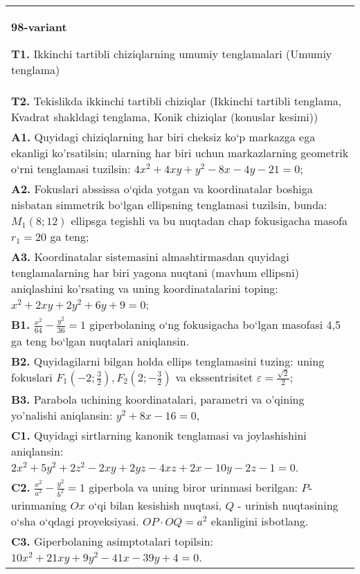 \documentclass{article}
\begin{document}
\begin{tabular}{m{17cm}}
\textbf{98-variant}
\newline

\textbf{T1.} Ikkinchi tartibli chiziqlarning umumiy tenglamalari (Umumiy tenglama) \\
\textbf{T2.} Tekislikda ikkinchi tartibli chiziqlar (Ikkinchi tartibli tenglama, Kvadrat shakldagi tenglama, Konik chiziqlar (konuslar kesimi)) \\
\textbf{A1.} Quyidagi chiziqlarning har biri cheksiz ko‘p markazga ega ekanligi ko'rsatilsin; ularning har biri uchun markazlarning geometrik o‘rni tenglamasi tuzilsin: $4 x^2+4 x y+y^2-8 x-4 y-21=0$; \\
\textbf{A2.} Fokuslari abssissa o‘qida yotgan va koordinatalar boshiga nisbatan simmetrik bo‘lgan ellipsning tenglamasi tuzilsin, bunda: $M_1(8 ; 12)$ ellipsga tegishli va bu nuqtadan chap fokusigacha masofa $r_1=20$ ga teng; \\
\textbf{A3.} Koordinatalar sistemasini almashtirmasdan quyidagi tenglamalarning har biri yagona nuqtani (mavhum ellipsni) aniqlashini ko'rsating va uning koordinatalarini toping: $x^2+2 x y+2 y^2+6 y+9=0$; \\
\textbf{B1.} $\frac{x^2}{64}-\frac{y^2}{36}=1$ giperbolaning o‘ng fokusigacha bo‘lgan masofasi 4,5 ga teng bo‘lgan nuqtalari aniqlansin. \\
\textbf{B2.} Quyidagilarni bilgan holda ellips tenglamasini tuzing: uning fokuslari $F_1\left(-2; \frac{3}{2}\right), F_2\left(2;-\frac{3}{2}\right) $ va ekssentrisitet $\varepsilon=\frac{\sqrt{2}}{2}$; \\
\textbf{B3.} Parabola uchining koordinatalari, parametri va o'qining yo'nalishi aniqlansin: $y^2+8 x-16=0$, \\
\textbf{C1.} Quyidagi sirtlarning kanonik tenglamasi va joylashishini aniqlansin: $2 x^2+5 y^2+2 z^2-2 x y+2 y z-4 x z+2 x-10 y-2 z-1=0$. \\
\textbf{C2.} $\frac{x^2}{a^2}-\frac{y^2}{b^2}=1$ giperbola va uning biror urinmasi berilgan: $P$-urinmaning $O x$ o‘qi bilan kesishish nuqtasi, $Q$ - urinish nuqtasining o‘sha o‘qdagi proyeksiyasi. $O P \cdot O Q=a^2$ ekanligini isbotlang. \\
\textbf{C3.} Giperbolaning asimptotalari topilsin: $10 x^2+21 x y+9 y^2-41 x-39 y+4=0$. \\

\end{tabular}
\vspace{1cm}
\end{document}
